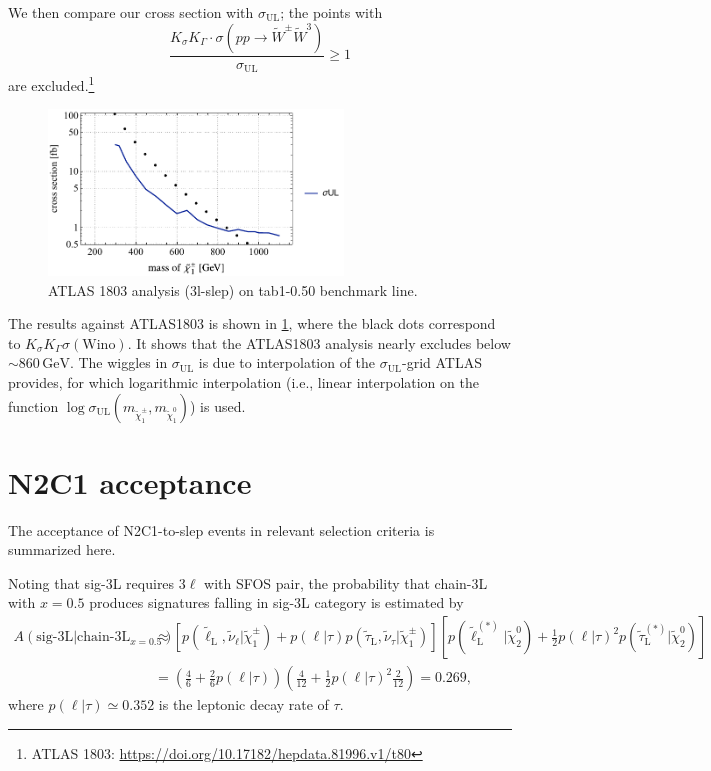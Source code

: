 \documentclass[a4paper,10pt,captions=tableheading,DIV=14]{scrartcl}
\numberwithin{equation}{section}
\newcommand\w[1]{_{\mathrm{#1}}}
\newcommand\unit[1]{\,\mathrm{#1}\xspace}
\newcommand\GeV{\unit{GeV}}
\newcommand\neut  [1][\relax]{{\tilde\chi^0_{#1}}}
\newcommand\charPM[1][\relax]{{\tilde\chi^\pm_{#1}}}
\begin{document}
We then compare our cross section with $\sigma\w{UL}$; the points with
\begin{equation}
 \frac{K_\sigma K_\Gamma\cdot \sigma(pp\to\tilde W^\pm\tilde W^3)}{\sigma\w{UL}} \ge 1
\end{equation}
are excluded.\footnote{
ATLAS 1803: \url{https://doi.org/10.17182/hepdata.81996.v1/t80}
}
\begin{figure}[h]
  \centering
  \includegraphics[height=125pt]{../plots/plot_data_tab1_x050_atlas1803.pdf}
  \caption{\label{fig:tab1_x050_atlas1803}ATLAS 1803 analysis (3l-slep) on tab1-0.50 benchmark line.}
\end{figure}

The results against ATLAS1803 is shown in \cref{fig:tab1_x050_atlas1803}, where the black dots correspond to $K_\sigma K_\Gamma \sigma(\text{Wino})$.
It shows that the ATLAS1803 analysis nearly excludes below $\sim860\GeV$.
The wiggles in $\sigma\w{UL}$ is due to interpolation of the $\sigma\w{UL}$-grid ATLAS provides, for which logarithmic interpolation (i.e., linear interpolation on the function $\log\sigma\w{UL}(m_{\charPM[1]},m_{\neut[1]})$) is used.



\appendix
\section{N2C1 acceptance}
The acceptance of N2C1-to-slep events in relevant selection criteria is summarized here.

Noting that sig-3L requires $3\ell$ with SFOS pair, the probability that chain-3L with $x=0.5$ produces signatures falling in sig-3L category is estimated by
\begin{align}
\label{eq:tau-3L-3L0.5}
 A(\text{sig-3L}|\text{chain-3L}_{x=0.5})&\approx
\left[
 p(\tilde\ell\w L,\tilde\nu_\ell|\charPM[1])
+ p(\ell|\tau)p(\tilde\tau\w L,\tilde\nu_\tau|\charPM[1])
\right]
\left[
 p(\tilde\ell\w L^{(*)}|\neut[2])
+ \frac12p(\ell|\tau)^2p(\tilde\tau\w L^{(*)}|\neut[2])
\right]
 \\&= \left(\frac46 + \frac26p(\ell|\tau)\right)
\left(\frac{4}{12}+\frac12p(\ell|\tau)^2\frac{2}{12}\right)=0.269,
\end{align}
where $p(\ell|\tau)\simeq0.352$ is the leptonic decay rate of $\tau$.



\end{document}
